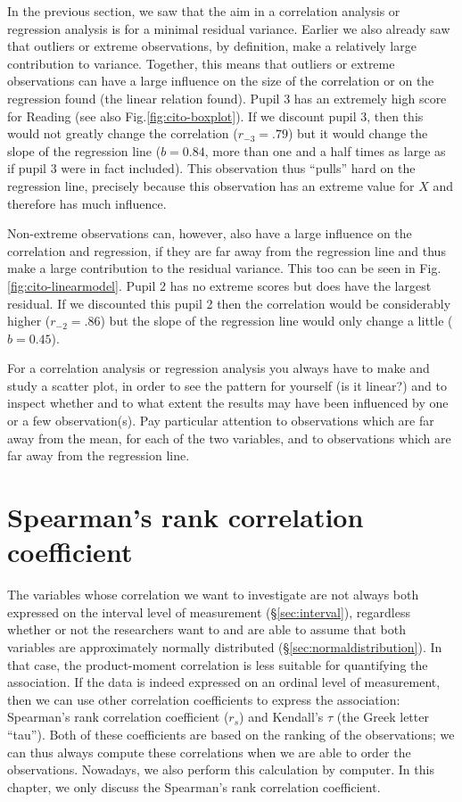 \documentclass[
]{book}
\begin{document}
In the previous section, we saw that the aim in a correlation analysis
or regression analysis is for a minimal residual variance.
Earlier we also already saw that outliers or extreme observations, by definition,
make a relatively large contribution to variance. Together, this means that
outliers or extreme observations can have a large influence on the size of
the correlation or on the regression found (the linear relation found). Pupil 3 has an
extremely high score for Reading (see also
Fig.\ref{fig:cito-boxplot}). If we discount pupil 3, then this would not greatly
change the correlation (\(r_{-3}=.79\)) but it would change the slope of the regression line
(\(b=0.84\), more than one and a half times as large as if pupil 3 were in fact included).
This observation thus ``pulls'' hard on the regression line, precisely because
this observation has an extreme value for \(X\) and therefore has much influence.

Non-extreme observations can, however, also have a large influence on the
correlation and regression, if they are far away from the regression line
and thus make a large contribution to the residual variance. This too can be seen in
Fig.\ref{fig:cito-linearmodel}.
Pupil 2 has no extreme scores
but does have the largest residual. If we discounted this pupil 2 then the
correlation would be considerably higher
(\(r_{-2}=.86\)) but the slope of the regression line would only
change a little (\(b=0.45\)).

For a correlation analysis or regression analysis you always have
to make and study a scatter plot, in order to see the pattern for yourself (is it linear?) and to inspect whether and to what extent the results
may have been influenced by one or a few observation(s). Pay
particular attention to observations which are far away from the mean, for each
of the two variables, and to observations which are far away from the regression line.

\hypertarget{sec:Spearman}{%
\section{Spearman's rank correlation coefficient}\label{sec:Spearman}}

The variables whose correlation we want to investigate
are not always both expressed on the interval level of measurement
(§\ref{sec:interval}), regardless whether or not the researchers
want to and are able to assume that both variables are
approximately normally distributed
(§\ref{sec:normaldistribution}).
In that case, the product-moment correlation is less suitable for
quantifying the association. If the data is indeed expressed on an
ordinal level of measurement, then we can use other correlation coefficients
to express the association: Spearman's rank correlation coefficient
(\(r_s\)) and Kendall's \(\tau\) (the Greek letter ``tau''). Both of these coefficients
are based on the ranking of the observations; we can thus always compute these correlations
when we are able to order the observations. Nowadays, we also perform this calculation
by computer. In this chapter, we only discuss the Spearman's rank correlation
coefficient.
\end{document}
